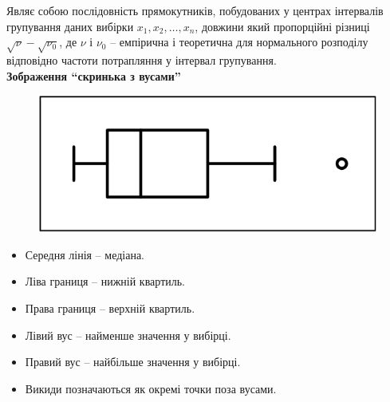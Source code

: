 Являє собою послідовність прямокутників, побудованих у центрах інтервалів групування даних вибірки $x_1, x_2, \ldots, x_n$, довжини який пропорційні різниці $\sqrt{\nu} - \sqrt{\nu_0}$, де $\nu$ і $\nu_0$ -- емпірична і теоретична для нормального розподілу відповідно частоти потрапляння у інтервал групування. \\

\textbf{Зображення ``скринька з вусами''}

\begin{figure}[H]
    \centering
    \includegraphics[width=.5\linewidth]{boxplot.png}
\end{figure}

\begin{itemize}
    \item Середня лінія -- медіана.
    \item Ліва границя -- нижній квартиль.
    \item Права границя -- верхній квартиль.
    \item Лівий вус -- найменше значення у вибірці.
    \item Правий вус -- найбільше значення у вибірці.
    \item Викиди позначаються як окремі точки поза вусами.
\end{itemize}


